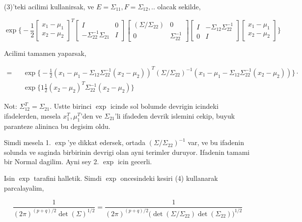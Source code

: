 \documentclass[12pt,fleqn]{article}\usepackage{../common}
\begin{document}
(3)'teki acilimi kullanirsak, ve $E = \Sigma_{11},F=\Sigma_{12},..$ olacak sekilde,

\[ \exp 
\bigg\{ 
-\frac{ 1}{2}
\left[\begin{array}{r}
x_1 - \mu_1\\
x_2 - \mu_2
\end{array}\right]^T
\left[\begin{array}{rr}
I & 0 \\ 
-\Sigma_{22}^{-1}\Sigma_{21} & I
\end{array}\right]
\left[\begin{array}{rr}
(\Sigma/\Sigma_{22}) & 0 \\ 
0 & \Sigma_{22}^{-1} 
\end{array}\right]
\left[\begin{array}{rr}
I & -\Sigma_{12}\Sigma_{22}^{-1}  \\ 
0 & I
\end{array}\right]
\left[\begin{array}{r}
x_1 - \mu_1\\
x_2 - \mu_2
\end{array}\right]
\bigg\}
 \]


Acilimi tamamen yaparsak, 

\[ 
 \begin{array}{lll}
= && \exp \bigg\{
-\frac{1 }{2} 
(x_1 - \mu_1 - \Sigma_{12}\Sigma_{22}^{-1} (x_2 - \mu_2))^T 
(\Sigma/\Sigma_{22})^{-1} 
(x_1 - \mu_1 - \Sigma_{12}\Sigma_{22}^{-1} (x_2 - \mu_2))
\bigg\} \cdot \\
&& \exp \bigg\{
1\frac{ 1}{2}(x_2-\mu_2)^T\Sigma_{22}^{-1} (x_2-\mu_2)
 \bigg\}
\end{array}
 \]

Not: $\Sigma_{12}^T = \Sigma_{21}$. Ustte birinci $\exp$ icinde sol bolumde devrigin icindeki ifadelerden,  
mesela $x_1^T,\mu_1^T$'den ve $\Sigma_{21}$'li ifadeden devrik islemini cekip, buyuk paranteze 
alininca bu degisim oldu. 

Simdi mesela 1. $\exp$'ye dikkat edersek, ortada $(\Sigma/\Sigma_{22})^{-1} $ var, ve bu ifadenin solunda ve saginda 
birbirinin devrigi olan ayni terimler duruyor. Ifadenin tamami bir Normal
dagilim. Ayni sey 2. $\exp$ icin gecerli. 

Isin $\exp$ tarafini halletik. Simdi $\exp$ oncesindeki kesiri (4) kullanarak
parcalayalim, 

\[ 
\frac{ 1}{(2\pi)^{(p+q)/2} \det(\Sigma)^{1/2}}  = 
\frac{ 1}{(2\pi)^{(p+q)/2} \bigg(\det(\Sigma/\Sigma_{22})\det(\Sigma_{22})\bigg)^{1/2}} 
 \]
\end{document}
